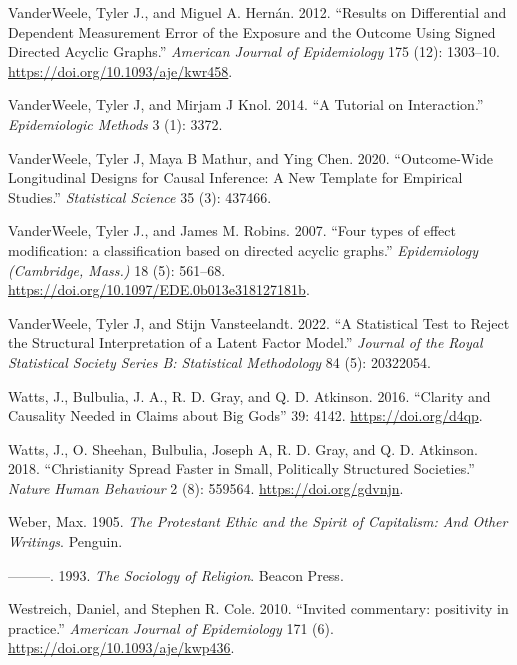 \documentclass[
  singlecolumn]{article}
\newlength{\cslhangindent}
\newlength{\cslentryspacingunit} %
\newenvironment{CSLReferences}[2] %
 {%
  \setlength{\parindent}{0pt}
  \ifodd #1
  \let\oldpar\par
  \def\par{\hangindent=\cslhangindent\oldpar}
  \fi
  \setlength{\parskip}{#2\cslentryspacingunit}
 }%
 {}
\begin{document}
\begin{CSLReferences}{1}{0}
\leavevmode{}%
VanderWeele, Tyler J., and Miguel A. Hernán. 2012. {``Results on
Differential and Dependent Measurement Error of the Exposure and the
Outcome Using Signed Directed Acyclic Graphs.''} \emph{American Journal
of Epidemiology} 175 (12): 1303--10.
\url{https://doi.org/10.1093/aje/kwr458}.

\leavevmode{}%
VanderWeele, Tyler J, and Mirjam J Knol. 2014. {``A Tutorial on
Interaction.''} \emph{Epidemiologic Methods} 3 (1): 3372.

\leavevmode{}%
VanderWeele, Tyler J, Maya B Mathur, and Ying Chen. 2020.
{``Outcome-Wide Longitudinal Designs for Causal Inference: A New
Template for Empirical Studies.''} \emph{Statistical Science} 35 (3):
437466.

\leavevmode{}%
VanderWeele, Tyler J., and James M. Robins. 2007. {``Four types of
effect modification: a classification based on directed acyclic
graphs.''} \emph{Epidemiology (Cambridge, Mass.)} 18 (5): 561--68.
\url{https://doi.org/10.1097/EDE.0b013e318127181b}.

\leavevmode{}%
VanderWeele, Tyler J, and Stijn Vansteelandt. 2022. {``A Statistical
Test to Reject the Structural Interpretation of a Latent Factor
Model.''} \emph{Journal of the Royal Statistical Society Series B:
Statistical Methodology} 84 (5): 20322054.

\leavevmode{}%
Watts, J., Bulbulia, J. A., R. D. Gray, and Q. D. Atkinson. 2016.
{``Clarity and Causality Needed in Claims about Big Gods''} 39: 4142.
\url{https://doi.org/d4qp}.

\leavevmode{}%
Watts, J., O. Sheehan, Bulbulia, Joseph A, R. D. Gray, and Q. D.
Atkinson. 2018. {``Christianity Spread Faster in Small, Politically
Structured Societies.''} \emph{Nature Human Behaviour} 2 (8): 559564.
\url{https://doi.org/gdvnjn}.

\leavevmode{}%
Weber, Max. 1905. \emph{The Protestant Ethic and the Spirit of
Capitalism: And Other Writings}. Penguin.

\leavevmode{}%
---------. 1993. \emph{The Sociology of Religion}. Beacon Press.

\leavevmode{}%
Westreich, Daniel, and Stephen R. Cole. 2010. {``Invited commentary:
positivity in practice.''} \emph{American Journal of Epidemiology} 171
(6). \url{https://doi.org/10.1093/aje/kwp436}.


\end{CSLReferences}
\end{document}
